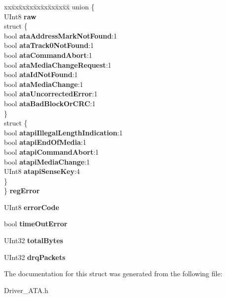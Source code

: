 \begin{DoxyCompactItemize}
\begin{tabbing}
xx\=xx\=xx\=xx\=xx\=xx\=xx\=xx\=xx\=\kill
union \{\\
\>UInt8 {\bfseries raw}\\
\mbox{\label{union_a_t_a_driver_1_1_r_e_g___c_m_d___i_n_f_o_1_1_0D11_a222af44e01d39ed3804bfd2a04756a8a}} 
\>struct \{\\
\>\>bool {\bfseries ataAddressMarkNotFound}:1\\
\>\>bool {\bfseries ataTrack0NotFound}:1\\
\>\>bool {\bfseries ataCommandAbort}:1\\
\>\>bool {\bfseries ataMediaChangeRequest}:1\\
\>\>bool {\bfseries ataIdNotFound}:1\\
\>\>bool {\bfseries ataMediaChange}:1\\
\>\>bool {\bfseries ataUncorrectedError}:1\\
\>\>bool {\bfseries ataBadBlockOrCRC}:1\\
\>\} \\
\mbox{\label{union_a_t_a_driver_1_1_r_e_g___c_m_d___i_n_f_o_1_1_0D11_af2ba58791a15886bad289d59b0684f58}} 
\>struct \{\\
\>\>bool {\bfseries atapiIllegalLengthIndication}:1\\
\>\>bool {\bfseries atapiEndOfMedia}:1\\
\>\>bool {\bfseries atapiCommandAbort}:1\\
\>\>bool {\bfseries atapiMediaChange}:1\\
\>\>UInt8 {\bfseries atapiSenseKey}:4\\
\>\} \\
\} {\bfseries regError}\\

\end{tabbing}\item 
\mbox{\label{struct_a_t_a_driver_1_1_r_e_g___c_m_d___i_n_f_o_a0c597a30d209a154fc8379fbe47a3a54}} 
U\+Int8 {\bfseries error\+Code}
\item 
\mbox{\label{struct_a_t_a_driver_1_1_r_e_g___c_m_d___i_n_f_o_a12df6f6ff7797f59bef81e268729db62}} 
bool {\bfseries time\+Out\+Error}
\item 
\mbox{\label{struct_a_t_a_driver_1_1_r_e_g___c_m_d___i_n_f_o_a1a1fe370e365d1a78298fac543836e8d}} 
U\+Int32 {\bfseries total\+Bytes}
\item 
\mbox{\label{struct_a_t_a_driver_1_1_r_e_g___c_m_d___i_n_f_o_ab98d73fbffb8b94c4e19f328ad9b5f80}} 
U\+Int32 {\bfseries drq\+Packets}
\end{DoxyCompactItemize}


The documentation for this struct was generated from the following file\+:\begin{DoxyCompactItemize}
\item 
Driver\+\_\+\+A\+T\+A.\+h\end{DoxyCompactItemize}

